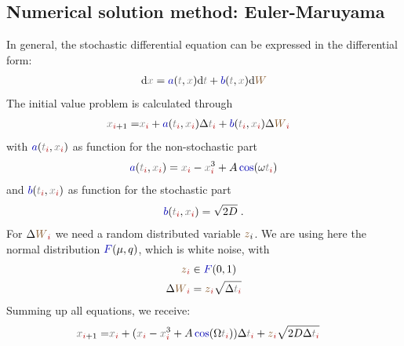 \documentclass[10pt,fleqn,%
reqno,a4paper]{article}
\makeatletter
\def\mathcolor#1#{\@mathcolor{#1}}
\def\@mathcolor#1#2#3{%
        \protect\leavevmode
        \begingroup\color#1{#2}#3\endgroup
}
\newcommand{\nx}{\mathcolor{gray}{x}}
\newcommand{\nt}{\mathcolor{gray}{t}}
\newcommand{\nW}{\mathcolor{brown!70!black}{W}}
\newcommand{\ncos}{\mathcolor{blue!70!black}{\cos}}
\newcommand{\nni}{\mathcolor{red!70!black}{i}}
\newcommand{\dif}{\mathrm{d}}
\newcommand{\na}{\mathcolor{blue!70!black}{a}}
\newcommand{\nb}{\mathcolor{blue!70!black}{b}}
\newcommand{\nN}{\mathcolor{blue!70!black}{N}}
\newcommand{\nz}{\mathcolor{brown!70!black}{z}}
\newcommand{\nF}{\mathcolor{blue!70!black}{F}}
\makeatother
\begin{document}
\subsection{Numerical solution method: Euler-Maruyama} \label{CH:EM}
In general, the stochastic differential equation can be expressed in the differential form:
\begin{align}
        \dif \nx = \na(\nt,\nx) \dif \nt + \nb(\nt,\nx )\dif \nW 
\end{align}
The initial value problem is calculated through
\begin{align}
\nx _{\nni+1}=& \nx _{\nni} +\na(\nt _{\nni},\nx _{\nni}) \Delta \nt_{\nni} + \nb(\nt _{\nni},\nx _{\nni}) \Delta \nW _{\nni}
\end{align}
with $  \na(\nt _{\nni},\nx _{\nni})  $ as function for the non-stochastic part
\begin{align*}
\na(\nt _{\nni},\nx _{\nni})= \nx_{\nni}-\nx _{\nni} ^3  + A\ncos (\omega \nt _{\nni})
\end{align*}
and $ \nb(\nt _{\nni},\nx _{\nni}) $ as function for the stochastic part
\begin{align*}
\nb(\nt _{\nni},\nx _{\nni}) = \sqrt{2D}\;.
\end{align*}
For $ \Delta \nW_{\nni}  $ we need a random distributed variable $ \nz_i $. We are using here the normal distribution $ \nF(\mu,q) $, which is white noise, with
\begin{align*}
	\nz_{\nni} & \in \nF(0,1)\\
	\Delta \nW_{\nni}& = \nz_{\nni}\sqrt{\Delta \nt_{\nni}}
\end{align*}
Summing up all equations, we receive:
\begin{align}
\nx _{\nni+1}=& \nx _{\nni} + (\nx_{\nni}-\nx _{\nni} ^3  + A\ncos (\Omega \nt _{\nni}) )\Delta \nt_{\nni} + \nz_{\nni} \sqrt{2D \Delta \nt_{\nni}} \label{eq:num}
\end{align}

\end{document}
